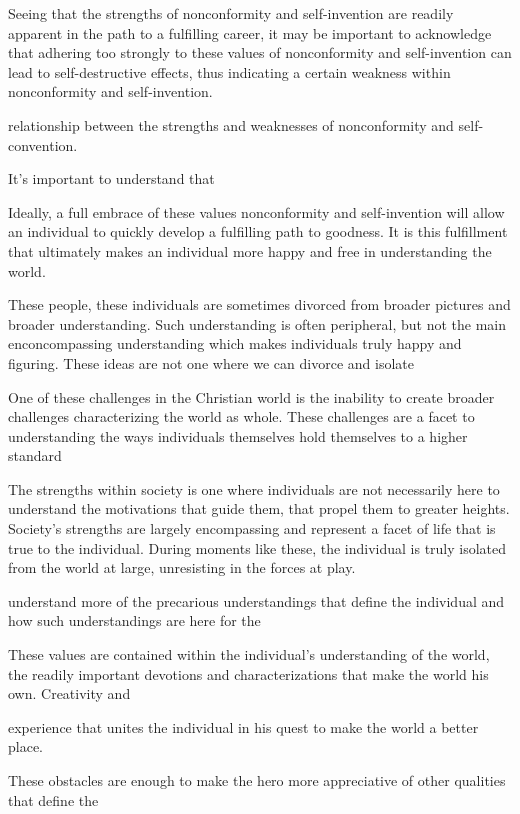 \documentclass[12pt,letterpaper]{article}
\newif\ifdraft
\begin{document}
Seeing that the strengths of nonconformity and self-invention are readily apparent in the path to a fulfilling career, it may be important to acknowledge that adhering too strongly to these values of nonconformity and self-invention can lead to self-destructive effects, thus indicating a certain weakness within nonconformity and self-invention.	


\ifdraft

 relationship between the strengths and weaknesses of nonconformity and self-convention.  

It's important to understand that 

Ideally, a full embrace of these values nonconformity and self-invention will allow an individual to quickly develop a fulfilling path to goodness.  It is this fulfillment that ultimately makes an individual more happy and free in understanding the world.  

These people, these individuals are sometimes divorced from broader pictures and broader understanding.  Such understanding is often peripheral, but not the main enconcompassing understanding which makes individuals truly happy and figuring.  These ideas are not one where we can divorce and isolate

One of these challenges in the Christian world is the inability to create broader challenges characterizing the world as whole.  These challenges are a facet to understanding the ways individuals themselves hold themselves to a higher standard 

The strengths within society is one where individuals are not necessarily here to understand the motivations that guide them, that propel them to greater heights.  Society's strengths are largely encompassing and represent a facet of life that is true to the individual.  During moments like these, the individual is truly isolated from the world at large, unresisting in the forces at play.  

understand more of the precarious understandings that define the individual and how such understandings are here for the 

 These values are contained within the individual's understanding of the world, the readily important devotions and characterizations that make the world his own.  Creativity and 

experience that unites the individual in his quest to make the world a better place.  

These obstacles are enough to make the hero more appreciative of other qualities that define the
\end{document}
